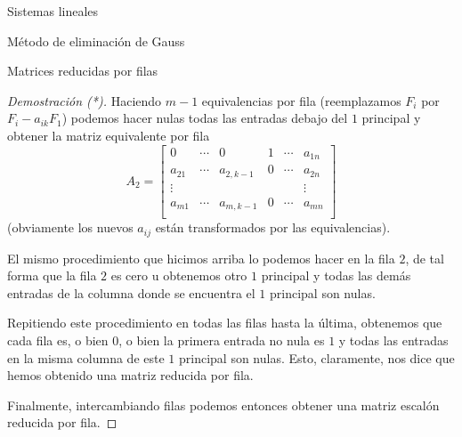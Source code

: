 \begin{chapter}{Sistemas lineales}
\begin{section}{Método de eliminación de Gauss }
\begin{subsection}{Matrices reducidas por filas}
\begin{proof}[Demostración (*)]
                    Haciendo $m-1$ equivalencias por fila (reemplazamos $F_i$ por $F_i - a_{ik}F_1$) podemos hacer nulas todas las entradas debajo del  $1$ principal y obtener la matriz equivalente por fila
                    \begin{equation*}
                    A_2 = \begin{bmatrix}
                    0 & \cdots & 0 & 1 & \cdots & a_{1n} \\
                    a_{21}& \cdots & a_{2,k-1} & 0 & \cdots & a_{2n} \\
                    \vdots&  &  &  &  & \vdots \\
                    a_{m1}& \cdots & a_{m,k-1} &0 & \cdots & a_{mn} \\
                    \end{bmatrix}
                    \end{equation*}
                    (obviamente los nuevos $a_{ij}$ están transformados por las equivalencias).
                    
                    El mismo procedimiento que hicimos arriba lo podemos hacer en la fila $2$,  de tal forma que la fila $2$ es cero u obtenemos otro $1$ principal y todas las demás entradas de la columna donde se encuentra el $1$ principal son nulas. 
                    
                    Repitiendo este procedimiento en todas las filas hasta la última, obtenemos que cada fila es, o bien $0$, o bien la primera entrada no nula es  $1$ y todas las entradas en la misma columna de este $1$ principal son nulas.   Esto, claramente, nos dice que hemos obtenido una matriz reducida por fila.  
                    
                 Finalmente, intercambiando filas podemos entonces obtener una matriz escalón reducida por fila.

                
                \end{proof}
                

\end{subsection}
\end{section}
\end{chapter}

